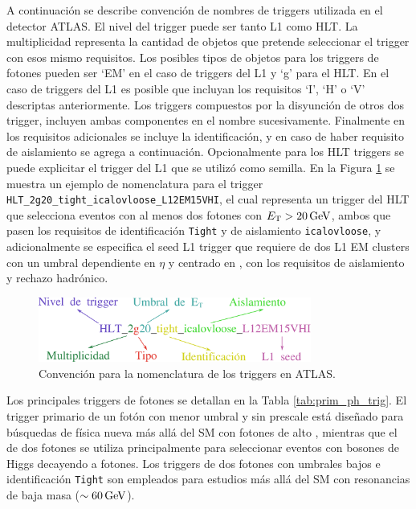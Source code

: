 A continuación se describe convención de nombres de triggers utilizada en el detector ATLAS.
El nivel del trigger puede ser tanto L1 como HLT. La multiplicidad representa la cantidad de objetos que pretende seleccionar el trigger con esos mismo requisitos. Los posibles tipos de objetos para los triggers de fotones pueden ser `EM' en el caso de triggers del L1 y `g' para el HLT. En el caso de triggers del L1 es posible que incluyan los requisitos `I', `H' o `V' descriptas anteriormente. Los triggers compuestos por la disyunción de otros dos trigger, incluyen ambas componentes en el nombre sucesivamente. Finalmente en los requisitos adicionales se incluye la identificación, y en caso de haber requisito de aislamiento se agrega a continuación. Opcionalmente para los HLT triggers se puede explicitar el trigger del L1 que se utilizó como semilla. En la Figura \ref{fig:trigger_name} se muestra un ejemplo de nomenclatura para el trigger \texttt{HLT\_2g20\_tight\_icalovloose\_L12EM15VHI}, el cual representa un trigger del HLT que selecciona eventos con al menos dos fotones con $E_{\text{T}}>20\,\text{GeV}$, ambos que pasen los requisitos de identificación \texttt{Tight} y de aislamiento \texttt{icalovloose}, y adicionalmente se especifica el seed L1 trigger que requiere de dos L1 EM clusters con un umbral dependiente en $\eta$ y centrado en , con los requisitos de aislamiento y rechazo hadrónico.

\begin{figure}
  \centering
  \includegraphics[width=0.8\textwidth]{images/trigger/trigger_name.pdf}
  \caption{Convención para la nomenclatura de los triggers en ATLAS.}
  \label{fig:trigger_name}
\end{figure}

Los principales triggers de fotones se detallan en la Tabla \ref{tab:prim_ph_trig}. El trigger primario de un fotón con menor umbral y sin prescale 
está diseñado para búsquedas de física nueva más allá del SM con fotones de alto \ET, mientras que el de dos fotones se utiliza principalmente para seleccionar eventos con bosones de Higgs decayendo a fotones. Los triggers de dos fotones con umbrales bajos e identificación \texttt{Tight} son empleados para estudios más allá del SM con resonancias de baja masa ($\sim60\,\text{GeV}$).



